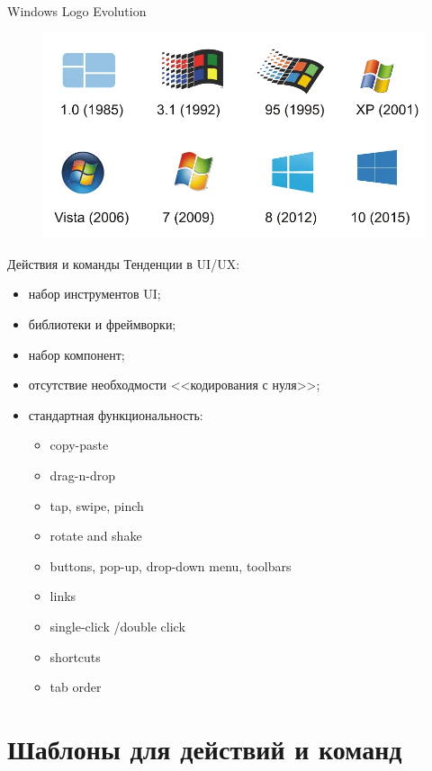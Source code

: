 \documentclass{beamer}
\begin{document}
\begin{frame}[t]{Windows Logo Evolution}
	\begin{figure}[h]
		\centering
		\includegraphics[scale=0.5]{images/windows_logo.png}
	\end{figure}
\end{frame}	

\begin{frame}[t]{Действия и команды}
	Тенденции в UI/UX:
	\begin{itemize}
		\item набор инструментов UI;
		\item библиотеки и фреймворки;
		\item набор компонент;
		\item отсутствие необходмости <<кодирования с нуля>>;
		\item стандартная функциональность:
		\begin{itemize}
			\item copy-paste
			\item drag-n-drop			
			\item tap, swipe, pinch			
			\item rotate and shake			
			\item buttons, pop-up, drop-down menu, toolbars
			\item links		
			\item single-click /double click				
			\item shortcuts			
			\item tab order			
		\end{itemize}
	\end{itemize}
\end{frame}

\section{Шаблоны для действий и команд}
\end{document}
